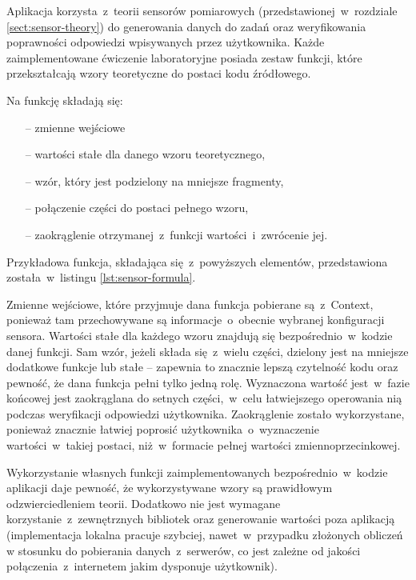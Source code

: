 Aplikacja korzysta~z~teorii sensorów pomiarowych (przedstawionej~w~rozdziale
\ref{sect:sensor-theory}) do generowania danych do zadań oraz weryfikowania poprawności odpowiedzi
 wpisywanych przez użytkownika. Każde zaimplementowane ćwiczenie laboratoryjne posiada zestaw
 funkcji, które przekształcają wzory teoretyczne do postaci kodu źródłowego.

Na funkcję składają się:
\begin{itemize}
  \item[--] zmienne wejściowe
  \item[--] wartości stałe dla danego wzoru teoretycznego,
  \item[--] wzór, który jest podzielony na mniejsze fragmenty,
  \item[--] połączenie części do postaci pełnego wzoru,
  \item[--] zaokrąglenie otrzymanej~z~funkcji wartości~i~zwrócenie jej.
\end{itemize}
Przykładowa funkcja, składająca się~z~powyższych elementów, przedstawiona została~w~listingu
\ref{lst:sensor-formula}.


Zmienne wejściowe, które przyjmuje dana funkcja pobierane są~z~Context, ponieważ tam przechowywane
są informacje~o~obecnie wybranej konfiguracji sensora. Wartości stałe dla każdego wzoru znajdują się
bezpośrednio~w~kodzie danej funkcji. Sam wzór, jeżeli składa się~z~wielu części, dzielony jest na
mniejsze dodatkowe funkcje lub stałe -- zapewnia to znacznie lepszą czytelność kodu oraz pewność, że
dana funkcja pełni tylko jedną rolę. Wyznaczona wartość jest~w~fazie końcowej jest zaokrąglana do
setnych części,~w~celu łatwiejszego operowania nią podczas weryfikacji odpowiedzi użytkownika.
Zaokrąglenie zostało wykorzystane, ponieważ znacznie łatwiej poprosić użytkownika~o~wyznaczenie
wartości~w~takiej postaci, niż~w~formacie pełnej wartości zmiennoprzecinkowej.

Wykorzystanie własnych funkcji zaimplementowanych bezpośrednio~w~kodzie aplikacji daje pewność, że
wykorzystywane wzory są prawidłowym odzwierciedleniem teorii. Dodatkowo nie jest wymagane
korzystanie~z~zewnętrznych bibliotek oraz generowanie wartości poza aplikacją (implementacja lokalna
pracuje szybciej, nawet~w~przypadku złożonych obliczeń w stosunku do pobierania danych~z~serwerów,
co jest zależne od jakości połączenia~z~internetem jakim dysponuje użytkownik).